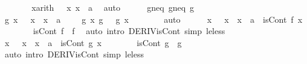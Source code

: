\begin{isabellebody}
\ \ \ \ \isamarkupfalse%
\ \isamarkupfalse%
\ x{\isacharbrackleft}{\kern0pt}arith{\isacharbrackright}{\kern0pt}{\isacharcolon}{\kern0pt}\ {\isachardoublequoteopen}{}\ {\isacharless}{\kern0pt}\ x{\isachardoublequoteclose}\ {\isachardoublequoteopen}x\ {\isacharless}{\kern0pt}\ a{\isachardoublequoteclose}\ \isamarkupfalse%
\ auto\isanewline
\ \ \ \ \isamarkupfalse%
\ g{\isacharprime}{\kern0pt}{\isacharunderscore}{\kern0pt}neq{\isacharunderscore}{\kern0pt}{}\ g{\isacharunderscore}{\kern0pt}neq{\isacharunderscore}{\kern0pt}{}\ {\isacartoucheopen}g\ {}\ {\isacharequal}{\kern0pt}\ {}{\isacartoucheclose}\ \isamarkupfalse%
\ g{\isacharprime}{\kern0pt}{\isacharcolon}{\kern0pt}\ {\isachardoublequoteopen}{\isasymAnd}x{\isachardot}{\kern0pt}\ {}\ {\isacharless}{\kern0pt}\ x\ {\isasymLongrightarrow}\ x\ {\isacharless}{\kern0pt}\ a\ \ {\isasymLongrightarrow}\ {}\ {\isasymnoteq}\ g{\isacharprime}{\kern0pt}\ x{\isachardoublequoteclose}\ {\isachardoublequoteopen}g\ {}\ {\isasymnoteq}\ g\ x{\isachardoublequoteclose}\isanewline
\ \ \ \ \ \ \isamarkupfalse%
\ auto\isanewline
\ \ \ \ \isamarkupfalse%
\ {\isachardoublequoteopen}{\isasymAnd}x{\isachardot}{\kern0pt}\ {}\ {\isasymle}\ x\ {\isasymLongrightarrow}\ x\ {\isacharless}{\kern0pt}\ a\ {\isasymLongrightarrow}\ isCont\ f\ x{\isachardoublequoteclose}\isanewline
\ \ \ \ \ \ \isamarkupfalse%
\ {\isacartoucheopen}isCont\ f\ {}{\isacartoucheclose}\ f\ \isamarkupfalse%
\ {\isacharparenleft}{\kern0pt}auto\ intro{\isacharcolon}{\kern0pt}\ DERIV{\isacharunderscore}{\kern0pt}isCont\ simp{\isacharcolon}{\kern0pt}\ le{\isacharunderscore}{\kern0pt}less{\isacharparenright}{\kern0pt}\isanewline
\ \ \ \ \isamarkupfalse%
\ \isamarkupfalse%
\ {\isachardoublequoteopen}{\isasymAnd}x{\isachardot}{\kern0pt}\ {}\ {\isasymle}\ x\ {\isasymLongrightarrow}\ x\ {\isacharless}{\kern0pt}\ a\ {\isasymLongrightarrow}\ isCont\ g\ x{\isachardoublequoteclose}\isanewline
\ \ \ \ \ \ \isamarkupfalse%
\ {\isacartoucheopen}isCont\ g\ {}{\isacartoucheclose}\ g\ \isamarkupfalse%
\ {\isacharparenleft}{\kern0pt}auto\ intro{\isacharcolon}{\kern0pt}\ DERIV{\isacharunderscore}{\kern0pt}isCont\ simp{\isacharcolon}{\kern0pt}\ le{\isacharunderscore}{\kern0pt}less{\isacharparenright}{\kern0pt}\isanewline
\ \ \ \ \isamarkupfalse%

\end{isabellebody}
